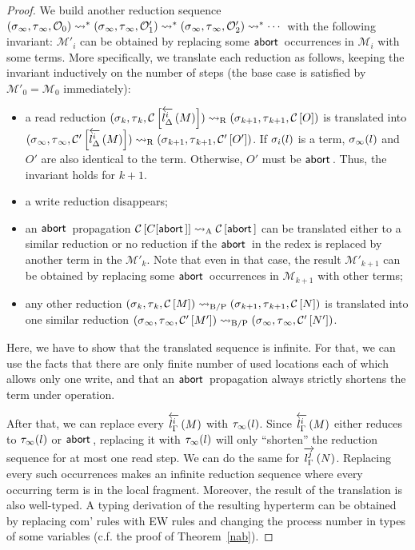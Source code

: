 {\begin{proof}
We build another reduction sequence
$
\conf{_\infty}{_\infty}{\hypert_0}
\reduce^\ast
\conf{_\infty}{_\infty}{\hypert'_1}
\reduce^\ast
\conf{_\infty}{_\infty}{\hypert'_2}
\reduce^\ast\cdots
$
with the following invariant:
$\mathcal M'_i$ can be obtained by replacing some $\abort$ occurrences
in $\mathcal M_i$ with some terms.
More specifically, we translate each reduction as follows, keeping the
invariant inductively on the number of steps
(the base case is satisfied by $\mathcal M'_0 = \mathcal M_0$ immediately):
\begin{itemize}
 \item a read reduction $\conf{_k}{_k}{\hypc{}{\rtol i l\Delta M}}
       \rreduce
       \conf{_{k+1}}{_{k+1}}{\hypc{}{O}}$ is translated into
       $\conf{_\infty}{_\infty}{\hypc'{\rtol i l\Delta M}} \rreduce
       \conf{_{k+1}}{_{k+1}}{\hypc'{O'}}$.
       If $\lstore_i(l)$ is a term,
       $\lstore_\infty(l)$ and $O'$ are also identical to the term.
       Otherwise, $O'$ must be $\abort$.
       Thus, the invariant
       holds for $k+1$.
 \item a write reduction disappears;
 \item an $\abort$ propagation
       $\hypc{}{C[\abort]} \areduce \hypc{}{\abort}$ can be translated
       either to a similar reduction or no reduction if the $\abort$ in
       the redex is replaced by another term in the $\mathcal{M'}_k$.
       Note that even in that case, the result $\mathcal{M'}_{k+1}$ can
       be obtained by replacing some $\abort$ occurrences in
       $\mathcal{M}_{k+1}$ with other terms;
 \item any other reduction $\conf{_k}{_k}{\hypc{}{M}} \bpreduce
       \conf{_{k+1}}{_{k+1}}{\hypc{}{N}}$
       is translated into one similar reduction
       $\conf{_\infty}{_\infty}{\hypc{'}{M'}}\bpreduce
        \conf{_\infty}{_\infty}{\hypc{'}{N'}}$.
\end{itemize}
Here, we have to show that the translated sequence is infinite.
 For that, we can use the facts that
 there are only finite
number of used locations each of which allows only one write, and that
an $\abort$ propagation always
strictly shortens the term under operation.

 After that, we can replace
 every ${\rtol i l\Gamma M}$ with
 $\rstore_\infty(l)$.
 Since $\rtol i l\Gamma M$ either reduces to $\rstore_\infty(l)$ or $\abort$,
 replacing it with $\rstore_\infty(l)$ will only ``shorten'' the reduction
 sequence for at most one read step.
 We can do the same for $\ltor j l \Gamma N$.
 Replacing every such occurrences
 makes an infinite reduction sequence where every occurring term is
 in the local fragment.
 Moreover,
 the result of the translation is also well-typed.
 A typing derivation of the resulting hyperterm can be obtained by
 replacing com' rules with EW rules and changing the process number in
 types of some variables (c.f. the proof of Theorem~\ref{nab}).


\end{proof}}
